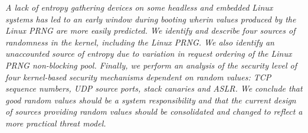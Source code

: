 \textit{A lack of entropy gathering devices on some headless and embedded Linux systems has led to an early window during booting wherin values produced by the Linux PRNG are more easily predicted.  We identify and describe four sources of randomness in the kernel, including the Linux PRNG. We also identify an unaccounted source of entropy due to variation in request ordering of the Linux PRNG non-blocking pool.  Finally, we perform an analysis of the security level of four kernel-based security mechanisms dependent on random values: TCP sequence numbers, UDP source ports, stack canaries and ASLR.  We conclude that good random values should be a system responsibility and that the current design of sources providing random values should be consolidated and changed to reflect a more practical threat model.}
